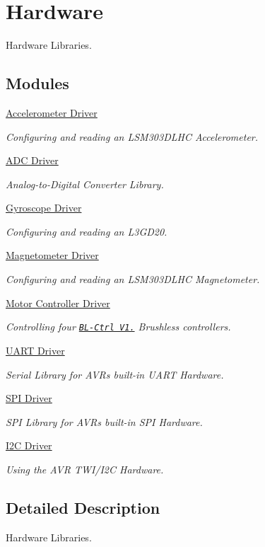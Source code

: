\hypertarget{group___hardware}{\section{Hardware}
\label{group___hardware}
}


Hardware Libraries.  


\subsection*{Modules}
\begin{DoxyCompactItemize}
\item 
\hyperlink{group__acc}{Accelerometer Driver}
\begin{DoxyCompactList}\small\item\em Configuring and reading an L\-S\-M303\-D\-L\-H\-C Accelerometer. \end{DoxyCompactList}\item 
\hyperlink{group__adc}{A\-D\-C Driver}
\begin{DoxyCompactList}\small\item\em Analog-\/to-\/\-Digital Converter Library. \end{DoxyCompactList}\item 
\hyperlink{group__gyro}{Gyroscope Driver}
\begin{DoxyCompactList}\small\item\em Configuring and reading an L3\-G\-D20. \end{DoxyCompactList}\item 
\hyperlink{group__mag}{Magnetometer Driver}
\begin{DoxyCompactList}\small\item\em Configuring and reading an L\-S\-M303\-D\-L\-H\-C Magnetometer. \end{DoxyCompactList}\item 
\hyperlink{group__motor}{Motor Controller Driver}
\begin{DoxyCompactList}\small\item\em Controlling four \href{https://www.mikrocontroller.com/index.php?main_page=product_info&products_id=209}{\tt B\-L-\/\-Ctrl V1.} Brushless controllers. \end{DoxyCompactList}\item 
\hyperlink{group__uart}{U\-A\-R\-T Driver}
\begin{DoxyCompactList}\small\item\em Serial Library for A\-V\-Rs built-\/in U\-A\-R\-T Hardware. \end{DoxyCompactList}\item 
\hyperlink{group__spi}{S\-P\-I Driver}
\begin{DoxyCompactList}\small\item\em S\-P\-I Library for A\-V\-Rs built-\/in S\-P\-I Hardware. \end{DoxyCompactList}\item 
\hyperlink{group__twi}{I2\-C Driver}
\begin{DoxyCompactList}\small\item\em Using the A\-V\-R T\-W\-I/\-I2\-C Hardware. \end{DoxyCompactList}\end{DoxyCompactItemize}


\subsection{Detailed Description}
Hardware Libraries. 